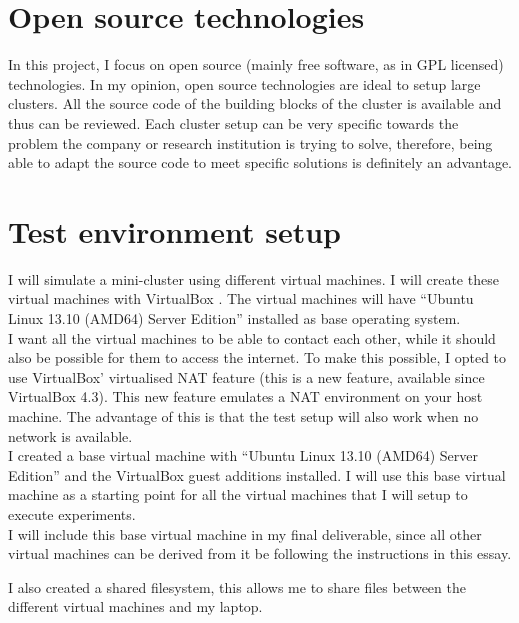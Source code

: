 \documentclass[12pt]{report}
\begin{document}
\section{Open source technologies}
In this project, I focus on open source (mainly free software, as in
GPL licensed) technologies. In my opinion,
open source technologies are ideal to setup large clusters. 
All the source code of the building blocks of the cluster is available
and thus can be reviewed. Each cluster setup can be very
specific towards the problem the company or research institution is
trying to solve, therefore, being able to adapt the source code to
meet specific solutions is definitely an advantage.

\section{Test environment setup}
I will simulate a mini-cluster using different virtual machines. I
will create these virtual machines with VirtualBox
\cite{virtualbox_soft:2013}.  The virtual machines will have
``Ubuntu Linux 13.10 (AMD64) Server Edition''
\cite{ubuntu_server_13_10:2013} installed as base operating system.\\

I want all the virtual machines to be able to contact each other,
while it should also be possible for them to access
the internet.
To make this possible, I opted to use VirtualBox' virtualised NAT
feature (this is a new feature, available since VirtualBox
4.3).
This new feature emulates a NAT environment on your host machine.
The advantage of this is that the test setup will also work when no
network is available.\\

I created a base virtual machine with ``Ubuntu Linux 13.10 (AMD64)
Server Edition''  and the VirtualBox guest additions
installed. I will use this base virtual machine as a starting point
for all the virtual machines that I will setup to execute
experiments.\\
I will include this base virtual machine in my final deliverable,
since all other virtual machines can be derived from it be following
the instructions in this essay.

I also created a shared filesystem, this allows me to share files between the
different virtual machines and my laptop.
\end{document}
